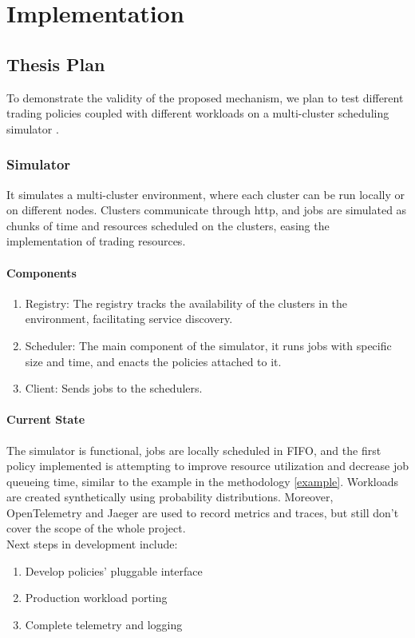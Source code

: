 
\chapter{Implementation}

\section{Thesis Plan}

To demonstrate the validity of the proposed mechanism, we plan to test different trading policies 
coupled with different workloads on a multi-cluster scheduling simulator \cite{sched-github}.

\subsection{Simulator}
It simulates a multi-cluster environment, where each cluster can be run locally or on different nodes. 
Clusters communicate through http, and jobs are simulated as chunks of time and resources scheduled on the clusters, 
easing the implementation of trading resources. 

\subsubsection{Components}
\begin{enumerate}
    \item Registry: The registry tracks the availability of the clusters in the environment, facilitating service discovery. 
    \item Scheduler: The main component of the simulator, it runs jobs with specific size and time, and enacts the policies 
    attached to it.
    \item Client: Sends jobs to the schedulers.
\end{enumerate}
\subsubsection{Current State}
The simulator is functional, jobs are locally scheduled in FIFO, and the first policy implemented 
is attempting to improve resource utilization and decrease job queueing time, similar to the example 
in the methodology \ref{example}. Workloads are created synthetically using probability distributions. 
Moreover, OpenTelemetry \cite{opentelemetry} and Jaeger \cite{jaeger} are used to record metrics 
and traces, but still don't cover the scope of the whole project.
\\Next steps in development include:
\begin{enumerate}
    \item Develop policies' pluggable interface
    \item Production workload porting
    \item Complete telemetry and logging
\end{enumerate}
